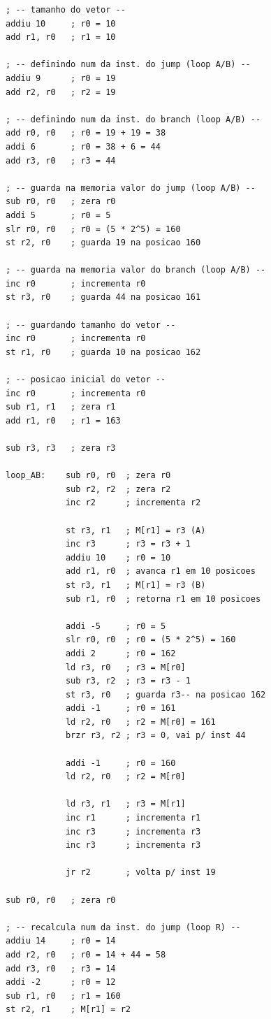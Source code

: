 \documentclass[twocolumn, 11pt]{article}
\begin{document}
\begin{lstlisting}
; -- tamanho do vetor --
addiu 10     ; r0 = 10
add r1, r0   ; r1 = 10

; -- definindo num da inst. do jump (loop A/B) --
addiu 9      ; r0 = 19
add r2, r0   ; r2 = 19

; -- definindo num da inst. do branch (loop A/B) --
add r0, r0   ; r0 = 19 + 19 = 38
addi 6       ; r0 = 38 + 6 = 44
add r3, r0   ; r3 = 44

; -- guarda na memoria valor do jump (loop A/B) --
sub r0, r0   ; zera r0
addi 5       ; r0 = 5 
slr r0, r0   ; r0 = (5 * 2^5) = 160
st r2, r0    ; guarda 19 na posicao 160

; -- guarda na memoria valor do branch (loop A/B) --
inc r0       ; incrementa r0
st r3, r0    ; guarda 44 na posicao 161

; -- guardando tamanho do vetor --
inc r0       ; incrementa r0
st r1, r0    ; guarda 10 na posicao 162

; -- posicao inicial do vetor -- 
inc r0       ; incrementa r0
sub r1, r1   ; zera r1
add r1, r0   ; r1 = 163

sub r3, r3   ; zera r3

loop_AB:    sub r0, r0  ; zera r0
            sub r2, r2  ; zera r2
            inc r2      ; incrementa r2

            st r3, r1   ; M[r1] = r3 (A)
            inc r3      ; r3 = r3 + 1
            addiu 10    ; r0 = 10
            add r1, r0  ; avanca r1 em 10 posicoes
            st r3, r1   ; M[r1] = r3 (B)
            sub r1, r0  ; retorna r1 em 10 posicoes

            addi -5     ; r0 = 5
            slr r0, r0  ; r0 = (5 * 2^5) = 160
            addi 2      ; r0 = 162
            ld r3, r0   ; r3 = M[r0]
            sub r3, r2  ; r3 = r3 - 1
            st r3, r0   ; guarda r3-- na posicao 162
            addi -1     ; r0 = 161
            ld r2, r0   ; r2 = M[r0] = 161
            brzr r3, r2 ; r3 = 0, vai p/ inst 44

            addi -1     ; r0 = 160
            ld r2, r0   ; r2 = M[r0]

            ld r3, r1   ; r3 = M[r1]
            inc r1      ; incrementa r1
            inc r3      ; incrementa r3
            inc r3      ; incrementa r3

            jr r2       ; volta p/ inst 19

sub r0, r0   ; zera r0

; -- recalcula num da inst. do jump (loop R) --
addiu 14     ; r0 = 14
add r2, r0   ; r0 = 14 + 44 = 58
add r3, r0   ; r3 = 14
addi -2      ; r0 = 12
sub r1, r0   ; r1 = 160
st r2, r1    ; M[r1] = r2


\end{lstlisting}
\end{document}
